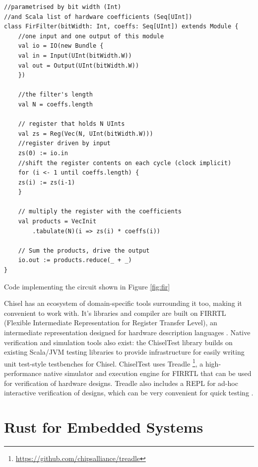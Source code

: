 \begin{listing}[h!]
    \vspace{0.5cm}
    \begin{verbatim}
//parametrised by bit width (Int)
//and Scala list of hardware coefficients (Seq[UInt])
class FirFilter(bitWidth: Int, coeffs: Seq[UInt]) extends Module {
    //one input and one output of this module
    val io = IO(new Bundle {
    val in = Input(UInt(bitWidth.W))
    val out = Output(UInt(bitWidth.W))
    })
    
    //the filter's length
    val N = coeffs.length

    // register that holds N UInts
    val zs = Reg(Vec(N, UInt(bitWidth.W)))
    //register driven by input
    zs(0) := io.in 
    //shift the register contents on each cycle (clock implicit)
    for (i <- 1 until coeffs.length) {
    zs(i) := zs(i-1)
    }

    // multiply the register with the coefficients
    val products = VecInit
        .tabulate(N)(i => zs(i) * coeffs(i))

    // Sum the products, drive the output
    io.out := products.reduce(_ + _)
}
    \end{verbatim}
    \caption{Code implementing the circuit shown in Figure \ref{fig:fir} \cite{chisel_site}}
    \label{lst:chisel_fir}
\end{listing}

Chisel has an ecosystem of domain-specific tools surrounding it too, making it convenient to work with. It's libraries and compiler are built on FIRRTL (Flexible Intermediate Representation for Register Transfer Level), an intermediate representation designed for hardware description languages \cite{firrtl}. Native verification and simulation tools also exist: the ChiselTest library builds on existing Scala/JVM testing libraries to provide infrastructure for easily writing unit test-style testbenches for Chisel. ChiselTest uses Treadle \footnote{\url{https://github.com/chipsalliance/treadle}}, a high-performance native simulator and execution engine for FIRRTL that can be used for verification of hardware designs. Treadle also includes a REPL for ad-hoc interactive verification of designs, which can be very convenient for quick testing \cite{chisel_site}.

\section{Rust for Embedded Systems}

